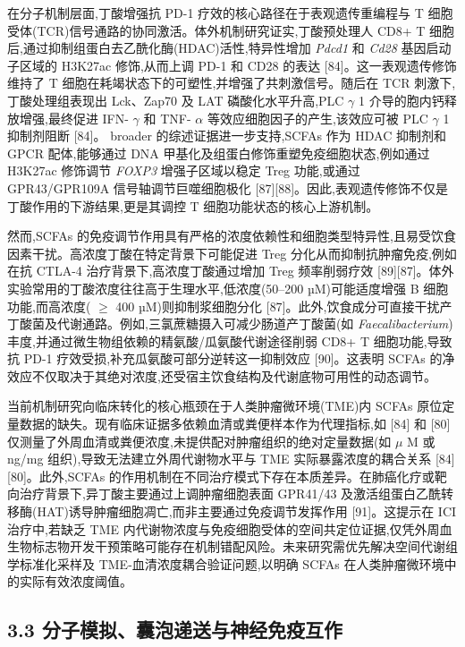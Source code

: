 在分子机制层面,丁酸增强抗 PD-1 疗效的核心路径在于表观遗传重编程与 T 细胞受体(TCR)信号通路的协同激活。体外机制研究证实,丁酸预处理人 CD8+ T 细胞后,通过抑制组蛋白去乙酰化酶(HDAC)活性,特异性增加 \emph{Pdcd1} 和 \emph{Cd28} 基因启动子区域的 H3K27ac 修饰,从而上调 PD-1 和 CD28 的表达 {[}84{]}。这一表观遗传修饰维持了 T 细胞在耗竭状态下的可塑性,并增强了共刺激信号。随后在 TCR 刺激下,丁酸处理组表现出 Lck、Zap70 及 LAT 磷酸化水平升高,PLC \(\gamma\) 1 介导的胞内钙释放增强,最终促进 IFN- \(\gamma\) 和 TNF- \(\alpha\) 等效应细胞因子的产生,该效应可被 PLC \(\gamma\) 1 抑制剂阻断 {[}84{]}。 broader 的综述证据进一步支持,SCFAs 作为 HDAC 抑制剂和 GPCR 配体,能够通过 DNA 甲基化及组蛋白修饰重塑免疫细胞状态,例如通过 H3K27ac 修饰调节 \emph{FOXP3} 增强子区域以稳定 Treg 功能,或通过 GPR43/GPR109A 信号轴调节巨噬细胞极化 {[}87{]}{[}88{]}。因此,表观遗传修饰不仅是丁酸作用的下游结果,更是其调控 T 细胞功能状态的核心上游机制。

然而,SCFAs 的免疫调节作用具有严格的浓度依赖性和细胞类型特异性,且易受饮食因素干扰。高浓度丁酸在特定背景下可能促进 Treg 分化从而抑制抗肿瘤免疫,例如在抗 CTLA-4 治疗背景下,高浓度丁酸通过增加 Treg 频率削弱疗效 {[}89{]}{[}87{]}。体外实验常用的丁酸浓度往往高于生理水平,低浓度(50--200 µM)可能适度增强 B 细胞功能,而高浓度( \(\geq\) 400 µM)则抑制浆细胞分化 {[}87{]}。此外,饮食成分可直接干扰产丁酸菌及代谢通路。例如,三氯蔗糖摄入可减少肠道产丁酸菌(如 \emph{Faecalibacterium})丰度,并通过微生物组依赖的精氨酸/瓜氨酸代谢途径削弱 CD8+ T 细胞功能,导致抗 PD-1 疗效受损,补充瓜氨酸可部分逆转这一抑制效应 {[}90{]}。这表明 SCFAs 的净效应不仅取决于其绝对浓度,还受宿主饮食结构及代谢底物可用性的动态调节。

当前机制研究向临床转化的核心瓶颈在于人类肿瘤微环境(TME)内 SCFAs 原位定量数据的缺失。现有临床证据多依赖血清或粪便样本作为代理指标,如 {[}84{]} 和 {[}80{]} 仅测量了外周血清或粪便浓度,未提供配对肿瘤组织的绝对定量数据(如 \(\mu\) M 或 ng/mg 组织),导致无法建立外周代谢物水平与 TME 实际暴露浓度的耦合关系 {[}84{]}{[}80{]}。此外,SCFAs 的作用机制在不同治疗模式下存在本质差异。在肺癌化疗或靶向治疗背景下,异丁酸主要通过上调肿瘤细胞表面 GPR41/43 及激活组蛋白乙酰转移酶(HAT)诱导肿瘤细胞凋亡,而非主要通过免疫调节发挥作用 {[}91{]}。这提示在 ICI 治疗中,若缺乏 TME 内代谢物浓度与免疫细胞受体的空间共定位证据,仅凭外周血生物标志物开发干预策略可能存在机制错配风险。未来研究需优先解决空间代谢组学标准化采样及 TME-血清浓度耦合验证问题,以明确 SCFAs 在人类肿瘤微环境中的实际有效浓度阈值。

\subsection{3.3 分子模拟、囊泡递送与神经免疫互作}\label{ux5206ux5b50ux6a21ux62dfux56caux6ce1ux9012ux9001ux4e0eux795eux7ecfux514dux75abux4e92ux4f5c}

